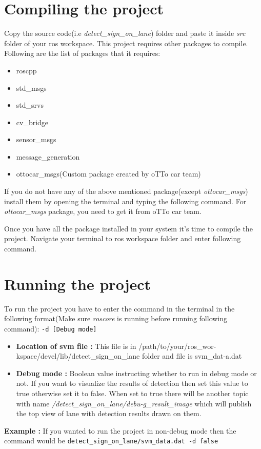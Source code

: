 \section{Compiling the project}
\label{sec:Compiling}
Copy the source code(i.e \emph{detect\_sign\_on\_lane}) folder and paste it inside \emph{src} folder of your ros workspace. This project requires other packages to compile. Following are the list of packages that it requires:
\begin{itemize}
    \item roscpp
    \item std\_msgs
    \item std\_srvs
    \item cv\_bridge
    \item sensor\_msgs
    \item message\_generation
    \item ottocar\_msgs(Custom package created by oTTo car team)
    \newline
\end{itemize}

If you do not have any of the above mentioned package(except \emph{ottocar\_msgs}) install them by opening the terminal and typing the following command.
For \emph{ottocar\_msgs} package, you need to get it from oTTo car team.
\newline

Once you have all the package installed in your system it's time to compile the project. Navigate your terminal to ros workspace folder and enter following command.

\section{Running the project}
To run the project you have to enter the command in the terminal in the following format(Make sure \emph{roscore} is running before running following command):
 \indent\indent\indent\texttt{\small{-d [Debug mode]}}
\begin{itemize}
    \item\textbf{Location of svm file :} This file is in /path/to/your/ros\_wor-kspace/devel/lib/detect\_sign\_on\_lane folder and file is svm\_dat-a.dat
    \item \textbf{Debug mode :} Boolean value instructing whether to run in debug mode or not. If you want to visualize the results of detection then set this value to true otherwise set it to false. When set to true there will be another topic with name \emph{/detect\_sign\_on\_lane/debu-g\_result\_image} which will publish the top view of lane with detection results drawn on them.
\end{itemize}

\textbf{Example : } If you wanted to run the project in non-debug mode then the command would be
\indent\indent\indent\texttt{\small detect\_sign\_on\_lane/svm\_data.dat -d false}